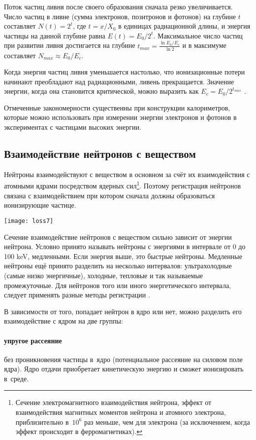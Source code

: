 Поток частиц ливня после своего образования сначала резко увеличивается.
Число частиц в ливне (сумма электронов, позитронов и фотонов) на глубине
$t$ составляет $N(t)=2^t$, где $t=x/X_0$ в единицах радиационной длины,
и энергия частицы на данной глубине равна $E(t)=E_0/2^t$. Максимальное
число частиц при развитии ливня достигается на глубине
$t_{max}=\frac{\ln E_0/E_c}{\ln2}$ и в максимуме составляет
$N_{max}\approx E_0/E_c$.

Когда энергия частиц ливня уменьшается настолько, что ионизационные
потери начинают преобладают над радиационными, ливень прекращается.
Значение энергии, когда она становится критической, можно выразить
как $E_c=E_0/2^{t_{max}}$ \cite{kor:06}.

Отмеченные закономерности существенны при конструкции калориметров,
которые можно использовать при измерении энергии электронов и фотонов
в экспериментах с частицами высоких энергии.

\subsection{Взаимодействие нейтронов с веществом}
Нейтроны взаимодействуют с веществом в основном за счёт их взаимодействия
с атомными ядрами посредством ядерных сил\footnote{Сечение
электромагнитного взаимодействия нейтрона, эффект от взаимодействия
магнитных моментов нейтрона и атомного электрона, приблизительно
в~$10^6$ раз меньше, чем для электрона (за исключением, когда эффект
происходит в ферромагнетиках).}. Поэтому регистрация нейтронов связана
с взаимодействием при котором сначала должны образоваться ионизирующие
частице.
\begin{floatingfigure}[l]{3.9cm}
  \texttt{[image: loss7]}
\end{floatingfigure}
\hspace{-0.3cm}
Сечение взаимодействие нейтронов с веществом сильно зависит от энергии
нейтрона. Условно принято называть нейтроны с энергиями в интервале
от 0 до 100 keV, медленными. Если энергия выше, это быстрые нейтроны.
Медленные нейтроны ещё принято разделить на несколько интервалов:
ультрахолодные (самые низко энергичные), холодные, тепловые  и так
называемые промежуточные. Для нейтронов того или иного энергетического
интервала, следует применять разные методы регистрации \cite{kal:66}.

В зависимости от того, попадает нейтрон в ядро или нет, можно разделить
его взаимодействие с ядром на две группы: \clearpage
\paragraph{упругое рассеяние} без проникновения частицы
в~ядро (потенциальное рассеяние на силовом поле ядра). Ядро отдачи
приобретает кинетическую энергию и сможет ионизировать в~среде.
